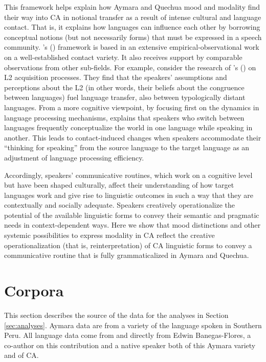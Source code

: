 \documentclass[output=paper,hidelinks]{langscibook}
\begin{document}
This framework helps explain how Aymara and Quechua mood and modality find their way into CA in notional transfer as a result of intense cultural and language contact. That is, it explains how languages can influence each other by borrowing conceptual notions (but not necessarily forms) that must be expressed in a speech community. \citeauthor{RN59}’s (\citeyear[62]{RN59}) framework is based in an extensive empirical-observational work on a well-established contact variety. It also receives support by comparable observations from other sub-fields. For example, consider the research of \citeauthor{RN60}’s (\citeyear{RN60}) on L2 acquisition processes. They find that the speakers’ assumptions and perceptions about the L2 (in other words, their beliefs about the congruence between languages) fuel language transfer, also between typologically distant languages. From a more cognitive viewpoint, by focusing first on the dynamics in language processing mechanisms, \citet{slobin2016thinking} explains that speakers who switch between languages frequently conceptualize the world in one language while speaking in another. This leads to contact-induced changes when speakers accommodate their “thinking for speaking” from the source language to the target language as an adjustment of language processing efficiency. 

Accordingly, speakers’ communicative routines, which work on a cognitive level but have been shaped culturally, affect their understanding of how target languages work and give rise to linguistic outcomes in such a way that they are contextually and socially adequate. Speakers creatively operationalize the potential of the available linguistic forms to convey their semantic and pragmatic needs in context-dependent ways. Here we show that mood distinctions and other systemic possibilities to express modality in CA reflect the creative operationalization (that is, reinterpretation) of CA linguistic forms to convey a communicative routine that is fully grammaticalized in Aymara and Quechua.

\section{Corpora}
\label{sec:corpora}
This section describes the source of the data for the analyses in Section \ref{sec:analyses}. Aymara data are from a variety of the language spoken in Southern Peru. All language data come from \citet{coler2014grammar} and directly from Edwin Banegas-Flores, a co-author on this contribution and a native speaker both of this Aymara variety and of CA.
\end{document}
